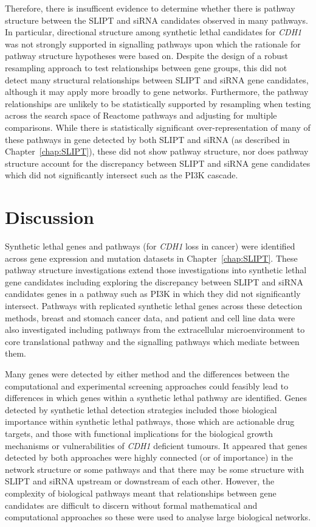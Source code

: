 Therefore, there is insufficent evidence to determine whether there is pathway structure between the \gls{SLIPT} and \gls{siRNA} candidates observed in many pathways. In particular, directional structure among synthetic lethal candidates for \textit{CDH1} was not strongly supported in signalling pathways upon which the rationale for pathway structure hypotheses were based on. Despite the design of a robust resampling approach to test relationships between gene groups, this did not detect many structural relationships between \gls{SLIPT} and \gls{siRNA} gene candidates, although it may apply more broadly to gene networks. Furthermore, the pathway relationships are unlikely to be statistically supported by resampling when testing across the search space of Reactome pathways and adjusting for multiple comparisons. While there is statistically significant over-representation of many of these pathways in gene detected by both \gls{SLIPT} and \gls{siRNA} (as described in Chapter~\ref{chap:SLIPT}), these did not show pathway structure, nor does pathway structure account for the discrepancy between \gls{SLIPT} and \gls{siRNA} gene candidates which did not significantly intersect such as the \gls{PI3K} cascade. 


\FloatBarrier

\section{Discussion}

Synthetic lethal genes and pathways (for \textit{CDH1} loss in cancer) were identified across gene expression and mutation datasets in Chapter~\ref{chap:SLIPT}. These pathway structure investigations extend those investigations into synthetic lethal gene candidates including exploring the discrepancy between \gls{SLIPT} and \gls{siRNA} candidates genes in a pathway such as \gls{PI3K} in which they did not significantly intersect. Pathways with replicated synthetic lethal genes across these detection methods, breast and stomach cancer data, and patient and cell line data were also investigated including pathways from the extracellular microenvironment to core translational pathway and the signalling pathways which mediate between them.

Many genes were detected by either method and the differences between the computational and experimental screening approaches could feasibly lead to differences in which genes within a synthetic lethal pathway are identified. Genes detected by synthetic lethal detection strategies included those biological importance within synthetic lethal pathways, those which are actionable drug targets, and those with functional implications for the biological growth mechanisms or vulnerabilities of \textit{CDH1} deficient tumours. It appeared that genes detected by both approaches were highly connected (or of importance) in the network structure or some pathways and that there may be some structure with \gls{SLIPT} and \gls{siRNA} upstream or downstream of each other. However, the complexity of biological pathways meant that relationships between gene candidates are difficult to discern without formal mathematical and computational approaches so these were used to analyse large biological networks.

